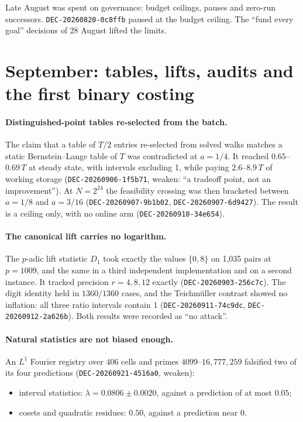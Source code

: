Late August was spent on governance: budget ceilings, pauses and
zero-run successors. \texttt{DEC-20260820-0c8ffb} paused at the budget
ceiling. The ``fund every goal'' decisions of 28 August lifted the limits.

\section{September: tables, lifts, audits and the first binary costing}

\paragraph{Distinguished-point tables re-selected from the batch.} The
claim that a table of $T/2$ entries re-selected from solved walks matches a
static Bernstein--Lange table of $T$ was contradicted at $a=1/4$. It
reached $0.65$--$0.69\,T$ at steady state, with intervals excluding 1,
while paying $2.6$--$8.9\,T$ of working storage (\texttt{DEC-20260906-1f5b71},
weaken: ``a tradeoff point, not an improvement''). At $N=2^{24}$ the
feasibility crossing was then bracketed between $a=1/8$ and $a=3/16$
(\texttt{DEC-20260907-9b1b02}, \texttt{DEC-20260907-6d9427}). The result is
a ceiling only, with no online arm (\texttt{DEC-20260910-34e654}).

\paragraph{The canonical lift carries no logarithm.} The $p$-adic lift
statistic $D_1$ took exactly the values $\{0,8\}$ on 1{,}035 pairs at
$p=1009$, and the same in a third independent implementation and on a
second instance. It tracked precision $r=4,8,12$ exactly
(\texttt{DEC-20260903-256c7c}). The digit identity held in $1360/1360$
cases, and the Teichmüller contrast showed no inflation: all three ratio
intervals contain 1 (\texttt{DEC-20260911-74c9dc},
\texttt{DEC-20260912-2a626b}). Both results were recorded as ``no attack''.

\paragraph{Natural statistics are not biased enough.} An $L^1$ Fourier
registry over 406 cells and primes $4099$--$16{,}777{,}259$ falsified two
of its four predictions (\texttt{DEC-20260921-4516a0}, weaken):
\begin{itemize}
\item interval statistics: $\lambda=0.0806\pm0.0020$, against a
  prediction of at most $0.05$;
\item cosets and quadratic residues: $0.50$, against a prediction near 0.
\end{itemize}

